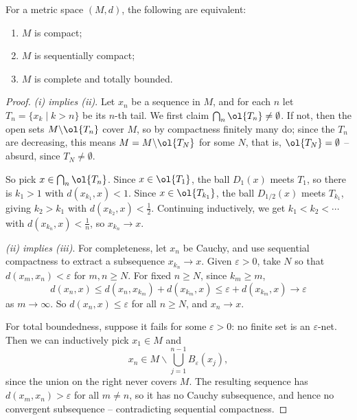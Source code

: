 \documentclass[a4paper]{scrartcl}
\begin{document}
\begin{theorem}\label{thm:bigequiv}
    For a metric space $(M, d)$, the following are equivalent:
    \begin{enumerate}[label=(\roman*)]
        \item $M$ is compact;
        \item $M$ is sequentially compact;
        \item $M$ is complete and totally bounded.
    \end{enumerate}
\end{theorem}
\begin{proof}
    \emph{(i) implies (ii)}. Let $x_n$ be a sequence in $M$, and for each $n$ let $T_n = \{x_k \mid k > n\}$ be its $n$-th tail. We first claim $\bigcap_{n} \ol{T_n} \neq \emptyset$. If not, then the open sets $M \backslash \ol{T_n}$ cover $M$, so by compactness finitely many do; since the $T_n$ are decreasing, this means $M = M \backslash \ol{T_N}$ for some $N$, that is, $\ol{T_N} = \emptyset$ -- absurd, since $T_N \neq \emptyset$.

    So pick $x \in \bigcap_n \ol{T_n}$. Since $x \in \ol{T_1}$, the ball $D_1(x)$ meets $T_1$, so there is $k_1 > 1$ with $d(x_{k_1}, x) < 1$. Since $x \in \ol{T_{k_1}}$, the ball $D_{1/2}(x)$ meets $T_{k_1}$, giving $k_2 > k_1$ with $d(x_{k_2}, x) < \frac{1}{2}$. Continuing inductively, we get $k_1 < k_2 < \cdots$ with $d(x_{k_n}, x) < \frac{1}{n}$, so $x_{k_n} \rightarrow x$.

    \emph{(ii) implies (iii)}. For completeness, let $x_n$ be Cauchy, and use sequential compactness to extract a subsequence $x_{k_n} \rightarrow x$. Given $\varepsilon > 0$, take $N$ so that $d(x_m, x_n) < \varepsilon$ for $m, n \geq N$. For fixed $n \geq N$, since $k_m \geq m$,
    $$
    d(x_n, x) \leq d(x_n, x_{k_m}) + d(x_{k_m}, x) \leq \varepsilon + d(x_{k_m}, x) \rightarrow \varepsilon
    $$
    as $m \rightarrow \infty$. So $d(x_n, x) \leq \varepsilon$ for all $n \geq N$, and $x_n \rightarrow x$.

    For total boundedness, suppose it fails for some $\varepsilon > 0$: no finite set is an $\varepsilon$-net. Then we can inductively pick $x_1 \in M$ and
    $$
    x_n \in M \backslash \bigcup_{j = 1}^{n - 1} B_{\varepsilon}(x_j),
    $$
    since the union on the right never covers $M$. The resulting sequence has $d(x_m, x_n) > \varepsilon$ for all $m \neq n$, so it has no Cauchy subsequence, and hence no convergent subsequence -- contradicting sequential compactness.


\end{proof}
\end{document}
